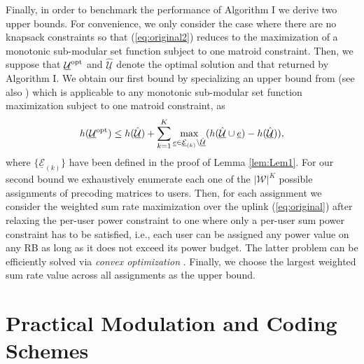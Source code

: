 \documentclass[11pt] {article}
\newcommand{\Wc} {{\mathcal W}}         \newcommand{\Wk} {{\bm {\mathcal W}}}
\newcommand{\Uulc} {{\underline{\mathcal U}}}
\newcommand{\Eulc} {{\underline{\mathcal E}}}
\begin{document}
Finally, in order to benchmark the performance of Algorithm I we derive two upper bounds. For convenience, we only consider the case where there are no knapsack constraints so that (\ref{eq:original2}) reduces to the maximization of a monotonic sub-modular set function  subject to one matroid constraint. Then,  we suppose that $\Uulc^{\rm opt}$ and $\hat{\Uulc}$ denote the optimal solution and that returned by Algorithm I. We obtain our first bound by specializing an  upper bound from \cite{Minoux:greedy}   (see also \cite{krause:greedy}) which is applicable to any monotonic sub-modular set function maximization subject to one matroid constraint, as
\begin{eqnarray}\label{eq:UB}
 h(\Uulc^{\rm opt})\leq  h(\hat{\Uulc}) + \sum_{k=1}^K\max_{\eul\in\Eulc_{(k)}\setminus\hat{\Uulc}}(h(\hat{\Uulc}\cup\eul)-h(\hat{\Uulc})),
   \end{eqnarray}
where $\{\Eulc_{(k)}\}$ have been defined in the proof of Lemma \ref{lem:Lem1}.
For our second bound we exhaustively enumerate each one of the $|\Wc|^K$ possible assignments of precoding matrices to users. Then, for each assignment we consider the weighted sum rate maximization over the uplink (\ref{eq:original}) after relaxing the per-user power constraint to one where only a per-user sum power constraint has to be satisfied, i.e., each user can be assigned any power value on any RB as long as it does not exceed its power budget. The latter problem can be efficiently solved via {\em convex optimization} \cite{yuWei:WF,mohseni:jsac}. Finally, we choose the largest weighted sum rate value across all assignments as the upper bound.



\section{Practical Modulation and Coding Schemes}
\end{document}
